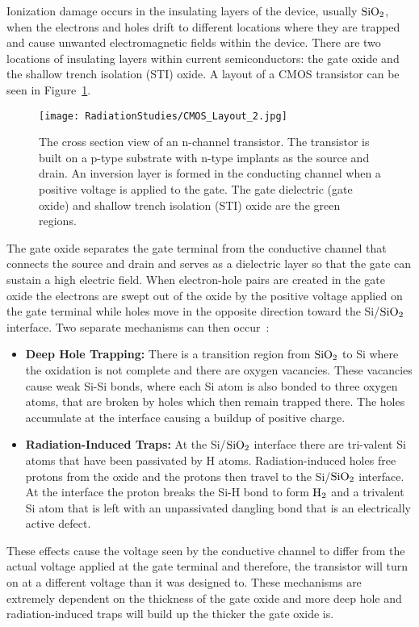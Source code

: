 Ionization damage occurs in the insulating layers of the device, usually $\ce{SiO_{2}}$, when the electrons and holes drift to different locations where they are trapped and cause unwanted electromagnetic fields within the device. There are two locations of insulating layers within current semiconductors: the gate oxide and the shallow trench isolation (STI) oxide. A layout of a CMOS transistor can be seen in Figure~\ref{fig:CMOS_Layout}\cite{CMOSLayout}.

\begin{figure}[h!]
\begin{center}
\texttt{[image: RadiationStudies/CMOS\_Layout\_2.jpg]}
\end{center}
\caption{The cross section view of an n-channel transistor. The transistor is built on a p-type substrate with n-type implants as the source and drain. An inversion layer is formed in the conducting channel when a positive voltage is applied to the gate. The gate dielectric (gate oxide) and shallow trench isolation (STI) oxide are the green regions\cite{CMOSLayout}.}
\label{fig:CMOS_Layout}
\end{figure}

The gate oxide separates the gate terminal from the conductive channel that connects the source and drain and serves as a dielectric layer so that the gate can sustain a high electric field. When electron-hole pairs are created in the gate oxide the electrons are swept out of the oxide by the positive voltage applied on the gate terminal while holes move in the opposite direction toward the Si/$\ce{SiO_{2}}$ interface. Two separate mechanisms can then occur~\cite{TIDEffects}: 
\begin{itemize}
\item \textbf{Deep Hole Trapping:}  There is a transition region from $\ce{SiO_{2}}$ to Si where the oxidation is not complete and there are oxygen vacancies. These vacancies cause weak Si-Si bonds, where each Si atom is also bonded to three oxygen atoms, that are broken by holes which then remain trapped there. The holes accumulate at the interface causing a buildup of positive charge.
\item \textbf{Radiation-Induced Traps:} At the Si/$\ce{SiO_{2}}$ interface there are tri-valent Si atoms that have been passivated by H atoms. Radiation-induced holes free protons from the oxide and the protons then travel to the Si/$\ce{SiO_{2}}$ interface. At the interface the proton breaks the Si-H bond to form $\ce{H_{2}}$ and a trivalent Si atom that is left with an unpassivated dangling bond that is an electrically active defect.
\end{itemize}
These effects cause the voltage seen by the conductive channel to differ from the actual voltage applied at the gate terminal and therefore, the transistor will turn on at a different voltage than it was designed to. These mechanisms are extremely dependent on the thickness of the gate oxide and more deep hole and radiation-induced traps will build up the thicker the gate oxide is. 

